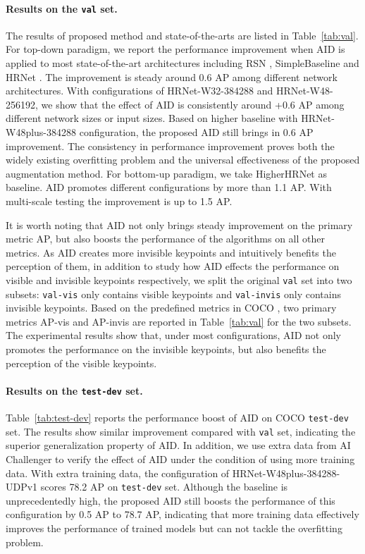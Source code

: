 \documentclass[final]{cvpr}
\begin{document}
\paragraph{Results on the \texttt{val} set.}
The results of proposed method and state-of-the-arts are listed in Table~\ref{tab:val}. For top-down paradigm, we report the performance improvement when AID is applied to most state-of-the-art architectures including RSN \cite{RSN}, SimpleBaseline \cite{SBNet} and HRNet \cite{HRNet}. The improvement is steady around 0.6 AP among different network architectures. With configurations of HRNet-W32-384288 and HRNet-W48-256192, we show that the effect of AID is consistently around +0.6 AP among different network sizes or input sizes. Based on higher baseline with HRNet-W48plus-384288 configuration, the proposed AID still brings in 0.6 AP improvement. The consistency in performance improvement proves both the widely existing overfitting problem and the universal effectiveness of the proposed augmentation method. For bottom-up paradigm, we take HigherHRNet \cite{Higher} as baseline. AID promotes different configurations by more than 1.1 AP. With multi-scale testing the improvement is up to 1.5 AP.

It is worth noting that AID not only brings steady improvement on the primary metric AP, but also boosts the performance of the algorithms on all other metrics. As AID creates more invisible keypoints and intuitively benefits the perception of them, in addition to study how AID effects the performance on visible and invisible keypoints respectively, we split the original \texttt{val} set into two subsets: \texttt{val-vis} only contains visible keypoints and \texttt{val-invis} only contains invisible keypoints. Based on the predefined metrics in COCO \cite{COCO}, two primary metrics AP-vis and AP-invis are reported in Table~\ref{tab:val} for the two subsets. The experimental results show that, under most configurations, AID not only promotes the performance on the invisible keypoints, but also benefits the perception of the visible keypoints.



\paragraph{Results on the \texttt{test-dev} set.} Table~\ref{tab:test-dev} reports the performance boost of AID on COCO \texttt{test-dev} set. The results show similar improvement compared with \texttt{val} set, indicating the superior generalization property of AID. In addition, we use extra data from AI Challenger \cite{AIchallenger} to verify the effect of AID under the condition of using more training data. With extra training data, the configuration of HRNet-W48plus-384288-UDPv1 scores 78.2 AP on \texttt{test-dev} set. Although the baseline is unprecedentedly high, the proposed AID still boosts the performance of this configuration by 0.5 AP to 78.7 AP, indicating that more training data effectively improves the performance of trained models but can not tackle the overfitting problem.
\end{document}
